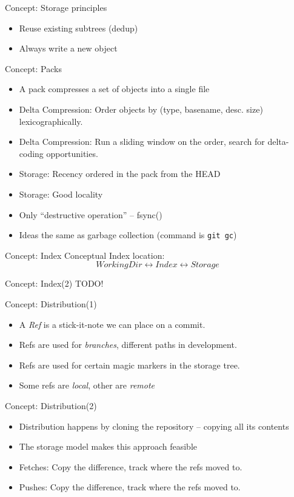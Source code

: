 \documentclass[xcolor=pdftex,dvipsnames]{beamer}
\begin{document}
\begin{frame}{Concept: Storage principles}
  \begin{itemize}
  \item Reuse existing subtrees (dedup)
  \item Always write a new object
  \end{itemize}
\end{frame}
\begin{frame}{Concept: Packs}
  \begin{itemize}
  \item A pack compresses a set of objects into a single file
  \item Delta Compression: Order objects by (type, basename,
    desc. size) lexicographically.
  \item Delta Compression: Run a sliding window on the order, search
    for delta-coding opportunities.
  \item Storage: Recency ordered in the pack from the HEAD
  \item Storage: Good locality
  \item Only ``destructive operation'' -- fsync()
  \item Ideas the same as garbage collection (command is \texttt{git gc})
  \end{itemize}
\end{frame}
\begin{frame}{Concept: Index}
Conceptual Index location:
$$
  WorkingDir \leftrightarrow Index \leftrightarrow Storage
$$
\end{frame}
\begin{frame}{Concept: Index(2)}
  TODO!
\end{frame}
\begin{frame}{Concept: Distribution(1)}
  \begin{itemize}
  \item A \emph{Ref} is a stick-it-note we can place on a commit.
  \item Refs are used for \emph{branches}, different paths in development.
  \item Refs are used for certain magic markers in the storage tree.
  \item Some refs are \emph{local}, other are \emph{remote}
  \end{itemize}
\end{frame}
\begin{frame}{Concept: Distribution(2)}
  \begin{itemize}
  \item Distribution happens by cloning the repository -- copying all
    its contents
  \item The storage model makes this approach feasible
  \item Fetches: Copy the difference, track where the refs moved to.
  \item Pushes:  Copy the difference, track where the refs moved to.
  \end{itemize}
\end{frame}
\end{document}
